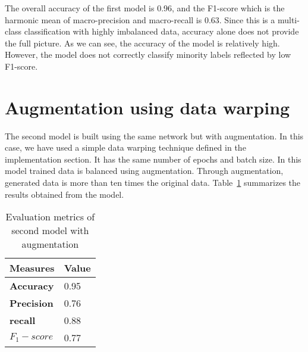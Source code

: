 The overall accuracy of the first model is 0.96, and the F1-score which is the harmonic mean of macro-precision and macro-recall is 0.63. Since this is a multi-class classification with highly imbalanced data, accuracy alone does not provide the full picture. As we can see, the accuracy of the model is relatively high. However, the model does not correctly classify minority labels reflected by low F1-score. 

\section{Augmentation using data warping}  

The second model is built using the same network but with augmentation. In this case, we have used a simple data warping technique defined in the implementation section. It has the same number of epochs and batch size. In this model trained data is balanced using augmentation. Through augmentation, generated data is more than ten times the original data. Table~\ref{table:model2_result} summarizes the results obtained from the model.

\begin{table}[ht]
	\centering
	\caption{Evaluation metrics of second model with augmentation}
	\label{table:model2_result}
	\begin{tabular}{|p{2cm}|p{2cm}|} 
		\hline
		\textbf{Measures} & \textbf{Value}\\ 
		\hline %
		\textbf{Accuracy} & 0.95  \\ 
		\textbf{Precision} & 0.76  \\ 
		
		\textbf{recall} & 0.88 \\ 
		
		\textbf{\textbf{$F_1-score$}} & 0.77 \\ 
		
		\hline		
	\end{tabular} %
	
\end{table} %
 
